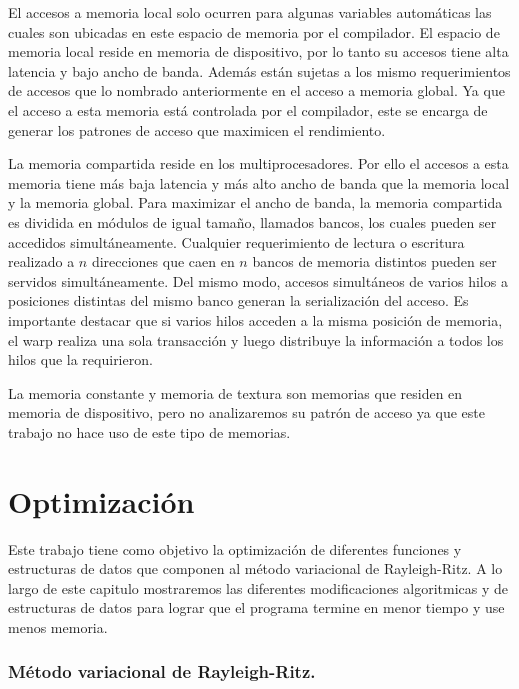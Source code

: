 \documentclass[a4paper,openright,12pt, oneside]{book}
\begin{document}
El accesos a memoria local solo ocurren para algunas variables autom\'aticas las cuales
son ubicadas en este espacio de memoria por el compilador. El espacio de memoria local
reside en memoria de dispositivo, por lo tanto su accesos tiene alta latencia y bajo
ancho de banda. Adem\'as est\'an sujetas a los mismo requerimientos de accesos que lo
nombrado anteriormente en el acceso a memoria global. Ya que el acceso a esta memoria
est\'a controlada por el compilador, este se encarga de generar los patrones de acceso
que maximicen el rendimiento.

La memoria compartida reside en los multiprocesadores. Por ello el accesos a esta memoria
tiene m\'as baja latencia y m\'as alto ancho de banda que la memoria local y la memoria global.
Para maximizar el ancho de banda, la memoria compartida es dividida en m\'odulos de
igual tama\~no, llamados bancos, los cuales pueden ser accedidos simult\'aneamente. Cualquier
requerimiento de lectura o escritura realizado a $n$ direcciones que caen en $n$ bancos
de memoria distintos pueden ser servidos simult\'aneamente. Del mismo modo, accesos simult\'aneos
de varios hilos a posiciones distintas del mismo banco generan la serializaci\'on del acceso.
Es importante destacar que si varios hilos acceden a la misma posici\'on de memoria, el
warp realiza una sola transacci\'on y luego distribuye la informaci\'on a todos los
hilos que la requirieron.

La memoria constante y memoria de textura son memorias que residen en memoria de
dispositivo, pero no analizaremos su patr\'on de acceso ya que este trabajo no hace
uso de este tipo de memorias.


\setcounter{chapter}{4}
\setcounter{section}{0}
\chapter*{Optimizaci\'on}\label{Optimizacion}
\markboth{}{} %

Este trabajo tiene como objetivo la optimizaci\'on de diferentes funciones y estructuras de datos que componen al m\'etodo variacional de Rayleigh-Ritz. A lo largo de este capitulo mostraremos las diferentes modificaciones algoritmicas y de estructuras de datos para lograr que el programa termine en menor tiempo y use menos memoria. 

\subsection{M\'etodo variacional de Rayleigh-Ritz.}
\end{document}
